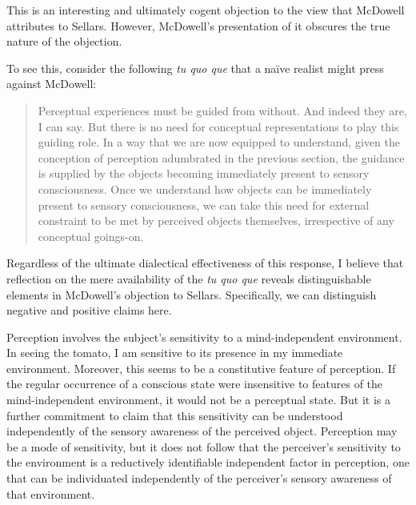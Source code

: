 \documentclass[12pt]{article}
\begin{document}
This is an interesting and ultimately cogent objection to the view that McDowell attributes to Sellars. However, McDowell's presentation of it obscures the true nature of the objection.


To see this, consider the following \emph{tu quo que} that a naïve realist might press against McDowell: 
\begin{quote}
    Perceptual experiences must be guided from without. And indeed they are, I can say. But there is no need for conceptual representations to play this guiding role. In a way that we are now equipped to understand, given the conception of perception adumbrated in the previous section, the guidance is supplied by the objects becoming immediately present to sensory consciousness. Once we understand how objects can be immediately present to sensory consciousness, we can take this need for external constraint to be met by perceived objects themselves, irrespective of any conceptual goings-on.
\end{quote}
Regardless of the ultimate dialectical effectiveness of this response, I believe that reflection on the mere availability of the \emph{tu quo que} reveals distinguishable elements in McDowell's objection to Sellars. Specifically, we can distinguish negative and positive claims here.

Perception involves the subject's sensitivity to a mind-independent environment. In seeing the tomato, I am sensitive to its presence in my immediate environment. Moreover, this seems to be a constitutive feature of perception. If the regular occurrence of a conscious state were insensitive to features of the mind-independent environment, it would not be a perceptual state. But it is a further commitment to claim that this sensitivity can be understood independently of the sensory awareness of the perceived object. Perception may be a mode of sensitivity, but it does not follow that the perceiver's sensitivity to the environment is a reductively identifiable independent factor in perception, one that can be individuated independently of the perceiver's sensory awareness of that environment.
\end{document}
